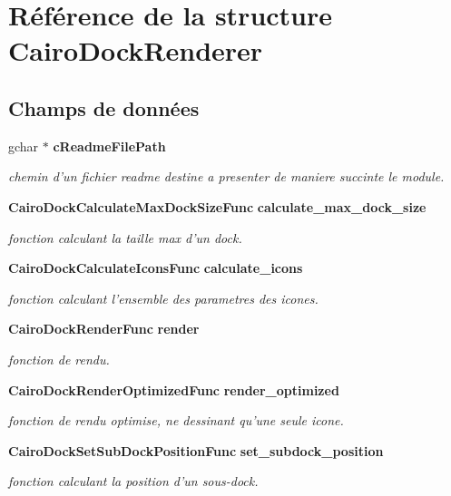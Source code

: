 \section{Référence de la structure CairoDockRenderer}
\label{structCairoDockRenderer}
\subsection*{Champs de données}
\begin{CompactItemize}
\item 
gchar $\ast$ {\bf cReadmeFilePath}
\begin{CompactList}\small\item\em chemin d'un fichier readme destine a presenter de maniere succinte le module. \item\end{CompactList}\item 
{\bf CairoDockCalculateMaxDockSizeFunc} {\bf calculate\_\-max\_\-dock\_\-size}
\begin{CompactList}\small\item\em fonction calculant la taille max d'un dock. \item\end{CompactList}\item 
{\bf CairoDockCalculateIconsFunc} {\bf calculate\_\-icons}
\begin{CompactList}\small\item\em fonction calculant l'ensemble des parametres des icones. \item\end{CompactList}\item 
{\bf CairoDockRenderFunc} {\bf render}
\begin{CompactList}\small\item\em fonction de rendu. \item\end{CompactList}\item 
{\bf CairoDockRenderOptimizedFunc} {\bf render\_\-optimized}
\begin{CompactList}\small\item\em fonction de rendu optimise, ne dessinant qu'une seule icone. \item\end{CompactList}\item 
{\bf CairoDockSetSubDockPositionFunc} {\bf set\_\-subdock\_\-position}
\begin{CompactList}\small\item\em fonction calculant la position d'un sous-dock. \item\end{CompactList}\item 

\end{CompactItemize}
